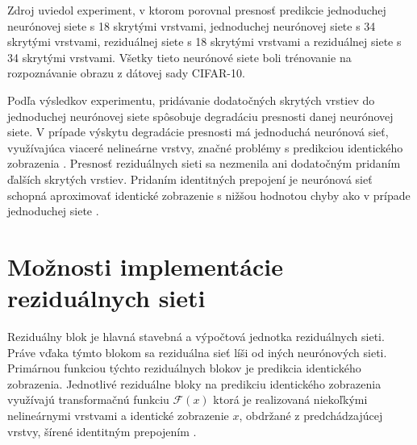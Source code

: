 Zdroj \cite{Wu2017} uviedol experiment, v ktorom porovnal presnosť predikcie jednoduchej neurónovej siete s 18 skrytými vrstvami, jednoduchej neurónovej siete s 34 skrytými vrstvami, reziduálnej siete s 18 skrytými vrstvami a reziduálnej siete s 34 skrytými vrstvami. Všetky tieto neurónové siete boli trénovanie na rozpoznávanie obrazu z dátovej sady CIFAR-10.

Podľa výsledkov experimentu, pridávanie dodatočných skrytých vrstiev do jednoduchej neurónovej siete spôsobuje degradáciu presnosti danej neurónovej siete. V prípade výskytu degradácie presnosti má jednoduchá neurónová sieť, využívajúca viaceré nelineárne vrstvy, značné problémy s predikciou identického zobrazenia \cite{Wu2017}. Presnosť reziduálnych sieti sa nezmenila ani dodatočným pridaním ďalších skrytých vrstiev. Pridaním identitných prepojení je neurónová sieť schopná aproximovať identické zobrazenie s nižšou hodnotou chyby ako v prípade jednoduchej siete \cite{Wu2017}.

\section{Možnosti implementácie reziduálnych sieti}
\label{implementation}

Reziduálny blok je hlavná stavebná a výpočtová jednotka reziduálnych sieti. Práve vďaka týmto blokom sa reziduálna sieť líši od iných neurónových sieti. Primárnou funkciou týchto reziduálnych blokov je predikcia identického zobrazenia. Jednotlivé reziduálne bloky na predikciu identického zobrazenia využívajú transformačnú funkciu $\mathcal{F}(x)$ ktorá je realizovaná niekoľkými nelineárnymi vrstvami a identické zobrazenie $x$, obdržané z predchádzajúcej vrstvy, šírené identitným prepojením \cite{He2016}. 

